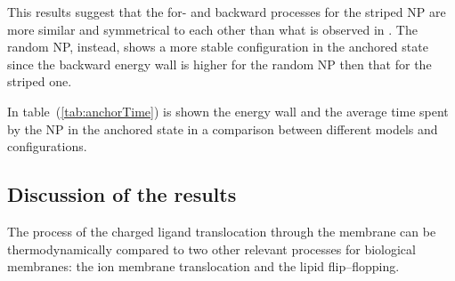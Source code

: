 This results suggest that the for- and backward processes for the striped \ac{NP} are more similar and symmetrical to each other than what is observed in \cite{ourPaper}. The random \ac{NP}, instead, shows a more stable configuration in the anchored state since the backward energy wall is higher for the random \ac{NP} then that for the striped one.

In table~(\ref{tab:anchorTime}) is shown the energy wall and the average time spent by the \ac{NP} in the anchored state in a comparison between different models and configurations.

\subsection{Discussion of the results}
The process of the charged ligand translocation through the membrane can be thermodynamically compared to two other relevant processes for biological membranes: the ion membrane translocation and the lipid flip--flopping.

